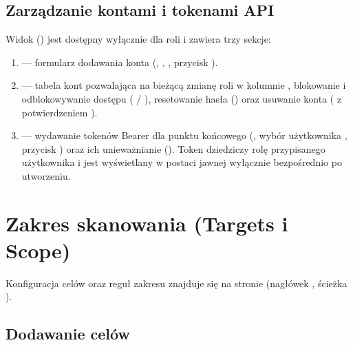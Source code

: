 \documentclass[10pt,a4paper]{article}
\begin{document}
\subsection{Zarządzanie kontami i tokenami API}

Widok  () jest dostępny wyłącznie dla roli  i zawiera trzy sekcje:
\begin{enumerate}
  \item {} --- formularz dodawania konta (, , , przycisk ).
  \item {} --- tabela kont pozwalająca na bieżącą zmianę roli w kolumnie , blokowanie i odblokowywanie dostępu ( / ), resetowanie hasła () oraz usuwanie konta ( z potwierdzeniem ).
  \item {} --- wydawanie tokenów Bearer dla punktu końcowego  (, wybór użytkownika , przycisk ) oraz ich unieważnianie (). Token dziedziczy rolę przypisanego użytkownika i jest wyświetlany w postaci jawnej wyłącznie bezpośrednio po utworzeniu.
\end{enumerate}


\section{Zakres skanowania (Targets i Scope)}

Konfiguracja celów oraz reguł zakresu znajduje się na stronie  (nagłówek , ścieżka ).

\subsection{Dodawanie celów}
\end{document}
